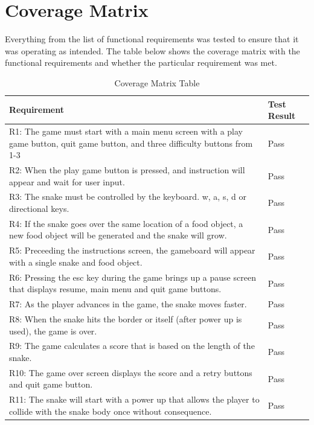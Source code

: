 \documentclass[12pt]{article}
\begin{document}
\newpage

\color{blue}
\section{Coverage Matrix}
Everything from the list of functional requirements was tested to ensure that it was operating as intended. The table below shows the coverage matrix with the functional requirements and whether the particular requirement was met.

\begin{center}
	\begin{longtable}{| p{10cm} | p{3cm} |}
	\caption{Coverage Matrix Table} \\ \hline \label{CoverageMatrix} 
	Requirement & Test Result \\ \hline
R1: The game must start with a main menu screen with a play game button, quit game button, and three difficulty buttons from 1-3 & Pass  \\ \hline
	R2: When the play game button is pressed, and instruction will appear and wait for
user input.& Pass  \\ \hline
	R3: The snake must be controlled by the keyboard. w, a, s, d or directional keys. & Pass  \\ \hline
	R4: If the snake goes over the same location of a food object, a new food object will
be generated and the snake will grow. & Pass  \\ \hline
	R5: Preceeding the instructions screen, the gameboard will appear with a single snake
and food object. & Pass  \\ \hline
R6: Pressing the esc key during the game brings up a pause screen that displays
resume, main menu and quit game buttons.& Pass  \\ \hline
	R7: As the player advances in the game, the snake moves faster. & Pass \\ \hline
	R8: When the snake hits the border or itself (after power up is used), the game is over. & Pass  \\ \hline
	R9: The game calculates a score that is based on the length of the snake. & Pass  \\ \hline
	R10: The game over screen displays the score and a retry buttons and quit game
button. & Pass  \\ \hline
	R11: The snake will start with a power up that allows the player to collide with the
snake body once without consequence. & Pass  \\ \hline
	

	\end{longtable}
\end{center}
\end{document}
